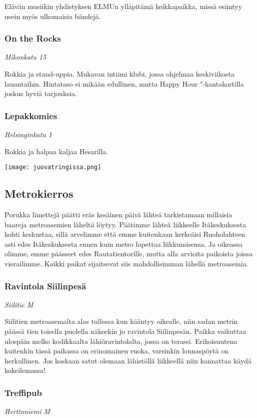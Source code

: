 \documentclass[../ala_hataile.tex]{subfiles}
\begin{document}
Elävän musiikin yhdistyksen ELMUn
ylläpitämä keikkapaikka, missä esiintyy
usein myös ulkomaisia bändejä.
\subsubsection*{On the Rocks}
\textit{Mikonkatu 15}

Rokkia ja stand-uppia. Mukavan intiimi
klubi, jossa ohjelmaa keskiviikosta lauantaihin.
Hintataso ei mikään edullinen, mutta
Happy Hour "-kantakortilla joskus hyviä
tarjouksia.
\subsubsection*{Lepakkomies}
\textit{Helsinginkatu 1}

Rokkia ja halpaa kaljaa Hesarilla.

\begin{figure*}[!b]
	\centering
	\texttt{[image: juovatringissa.png]}
\end{figure*}
\subsection*{Metrokierros}
Porukka limettejä päätti eräs kesäinen
päivä lähteä tarkistamaan millaisia baareja
metroasemien läheltä löytyy. Päätimme
lähteä liikkeelle Itäkeskuksesta kohti keskustaa, sillä arvelimme että emme kuitenkaan
kerkeäisi Ruoholahteen asti edes
Itäkeskuksesta ennen kuin metro lopettaa
liikkumisensa. Ja oikeassa olimme, emme
päässeet edes Rautatientorille, mutta alla
arvioita paikoista joissa vierailimme. Kaikki
paikat sijaitsevat siis mahdollisimman
lähellä metroasemia.
\subsubsection*{Ravintola Siilinpesä}
\textit{Siilitie M}

Siilitien metroasemalta alas tullessa kun
kääntyy oikealle, niin sadan metrin päässä
tien toisella puolella näkeekin jo ravintola
Siilinpesän. Paikka vaikuttaa ulospäin melko
kodikkaalta lähiöravintolalta, jossa on
terassi. Erikoisuutena kuitenkin tässä paikassa
on erinomainen ruoka, varsinkin lounaspöytä
on herkullinen. Jos koskaan satut
olemaan lähistöllä liikkeellä niin kannattaa
käydä kokeilemassa!
\subsubsection*{Treffipub}
\textit{Herttoniemi M}
\end{document}
